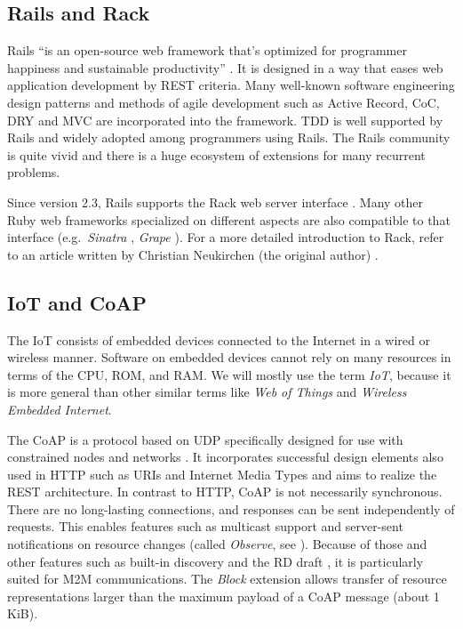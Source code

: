 	\subsection{\acl{Rails} and Rack}


		\acl{Rails} \enquote{is an open-source web framework that's optimized
		for programmer happiness and sustainable productivity} \cite{rails}. It
		is designed in a way that eases web application development by
		\ac{REST} criteria. Many well-known software engineering design
		patterns and methods of agile development such as Active Record,
		\acl{CoC}, \acl{DRY} and \acl{MVC} are incorporated into the framework.
		\acl{TDD} is well supported by \ac{Rails} and widely adopted among
		programmers using \ac{Rails}. The \ac{Rails} community is quite vivid
		and there is a huge ecosystem of extensions for many recurrent
		problems.

		Since version 2.3, \ac{Rails} supports the Rack web server interface
		\cite{rack}. Many other Ruby web frameworks specialized on different
		aspects are also compatible to that interface (e.g.\ \emph{Sinatra}
		\cite{sinatra}, \emph{Grape} \cite{grape}). For a more detailed
		introduction to Rack, refer to an article written by Christian
		Neukirchen (the original author) \cite{rack-intro}.

	\subsection{\acl{IoT} and \acs{CoAP}}
		
		The \acf{IoT} consists of embedded devices connected to the Internet in
		a wired or wireless manner. Software on embedded devices cannot rely on
		many resources in terms of the \ac{CPU}, \ac{ROM}, and \ac{RAM}. We
		will mostly use the term \emph{\acl{IoT}}, because it is more general
		than other similar terms like \emph{Web of Things} and \emph{Wireless
		Embedded Internet}.

		The \acf{CoAP} is a protocol based on \acs{UDP} specifically designed
		for use with constrained nodes and networks \cite{coap}
		\cite{coap-paper}. It incorporates successful design elements also
		used in \ac{HTTP} such as \acp{URI} and Internet Media Types and aims
		to realize the \ac{REST} architecture. In contrast to \ac{HTTP},
		\ac{CoAP} is not necessarily synchronous. There are no long-lasting
		connections, and responses can be sent independently of requests. This
		enables features such as multicast support \cite{coap-group} and
		server-sent notifications on resource changes (called \emph{Observe},
		see \cite{observe}). Because of those and other features such as
		built-in discovery and the \acf{RD} draft \cite{rd}, it is particularly
		suited for \ac{M2M} communications. The \emph{Block} extension
		\cite{block} allows transfer of resource representations larger than
		the maximum payload of a \ac{CoAP} message (about 1 KiB).

